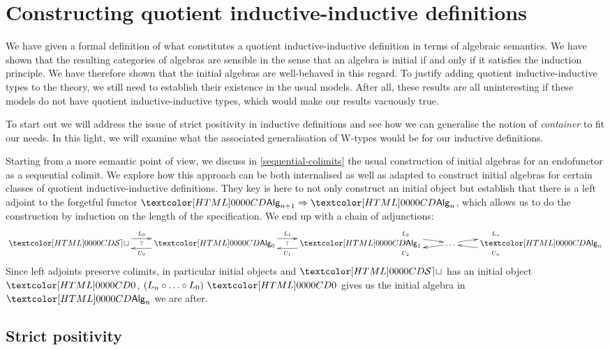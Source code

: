\chapter{Constructing quotient inductive-inductive definitions}
\label{constructing}

We have given a formal definition of what constitutes a quotient
inductive-inductive definition in terms of algebraic semantics. We
have shown that the resulting categories of algebras are sensible in
the sense that an algebra is initial if and only if it satisfies the
induction principle. We have therefore shown that the initial algebras
are well-behaved in this regard. To justify adding quotient
inductive-inductive types to the theory, we still need to establish
their existence in the usual models. After all, these results are all
uninteresting if these models do not have quotient inductive-inductive
types, which would make our results vacuously true.

To start out we will address the issue of strict positivity in
inductive definitions and see how we can generalise the notion of
\emph{container} to fit our needs. In this light, we will examine what
the associated generalisation of W-types would be for our inductive
definitions.

Starting from a more semantic point of view, we discuss in
\cref{sequential-colimits} the usual construction of initial algebras
for an endofunctor as a sequential colimit. We explore how this
approach can be both internalised as well as adapted to construct
initial algebras for certain classes of quotient inductive-inductive
definitions. They key is here to not only construct an initial object
but establish that there is a left adjoint to the forgetful functor
$\Func{\Alg_{n+1}}{\Alg_{n}}$, which allows us to do the construction
by induction on the length of the specification. We end up with a
chain of adjunctions:
$$
\xymatrix{
\SET \ar@/^/[r]^{L_0}
\ar@{}[r]|{\top} 
&\Alg_0 \ar@/^/[l]^{U_0} \ar@/^/[r]^{L_1} 
\ar@{}[r]|{\top} 
&\Alg_1 \ar@/^/[l]^{U_1} \ar@/^/[r]^{L_2} 
\ar@{}[r]|{\top} 
&\hdots \ar@/^/[l]^{U_2} \ar@/^/[r]^{L_n} 
\ar@{}[r]|{\top} 
&\Alg_n \ar@/^/[l]^{U_n}
}
$$
Since left adjoints preserve colimits, in particular initial objects
and $\SET$ has an initial object $\emptyty$,
$(L_n \circ \hdots \circ L_0)\ \emptyty$ gives us the initial algebra
in $\Alg_n$ we are after.

\section{Strict positivity}

